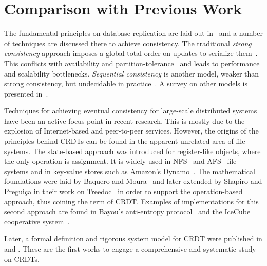 \section{Comparison with Previous Work}
\label{sec:previous_work}

The fundamental principles on database replication are laid out
in~\cite{lindsay} and a number of techniques are discussed there to achieve
consistency. The traditional \textit{strong consistency} approach imposes a
global total order on updates to serialize
them~\cite{Lamport:1978:TCO:359545.359563}. This conflicts with availability and
partition-tolerance~\cite{Gilbert:2002:BCF:564585.564601} and leads to
performance and scalability bottlenecks. \textit{Sequential consistency} is
another model, weaker than strong consistency, but undecidable in
practice~\cite{Qadeer:2003:VSC:939835.940001}. A survey on other models is
presented in~\cite{Mosberger:1993:MCM:160551.160553}.

Techniques for achieving eventual consistency for large-scale distributed
systems have been an active focus point in recent research. This is mostly due
to the explosion of Internet-based and peer-to-peer services. However, the
origins of the principles behind CRDTs can be found in the apparent unrelated
area of file systems. The state-based approach was introduced for register-like
objects, where the only operation is assignment. It is widely used in
NFS~\cite{Sandberg85designand} and AFS~\cite{Howard:1988:SPD:35037.35059} file
systems and in key-value stores such as Amazon's
Dynamo~\cite{DeCandia:2007:DAH:1294261.1294281}. The mathematical foundations
were laid by Baquero and Moura~\cite{scadt4} and later extended by Shapiro and
Pregui\c{c}a in their work on Treedoc~\cite{Preguica:2009:CRD:1584339.1584604}
in order to support the operation-based approach, thus coining the term of CRDT.
Examples of implementations for this second approach are found in Bayou's
anti-entropy protocol~\cite{Petersen:1997:FUP:268998.266711} and the IceCube
cooperative system~\cite{preguica:inria-00445758}.

Later, a formal definition and rigorous system model for CRDT were published
in \cite{shapiro:inria-00555588} and \cite{Shapiro:2011:CRD:2050613.2050642}.
These are the first works to engage a comprehensive and systematic study on
CRDTs. 